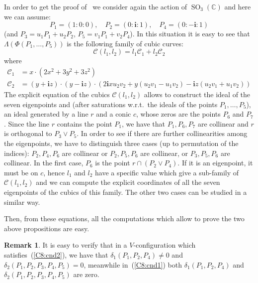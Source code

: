 \documentclass{amsart}
\theoremstyle{plain}
\theoremstyle{definition}
\newtheorem{rmk}[lemma]{Remark}
\newcommand{\C}{\mathbb{C}}
\newcommand{\SO}{\operatorname{SO}}
\newcommand{\iii}{\textbf{i}}
\begin{document}
In order to get the proof of~
we consider again the action of $\SO_3(\C)$ and here we can assume:
\[
P_1 = (1: 0: 0), \quad P_2 = (0: \iii: 1), \quad P_4 = (0: -\iii: 1)
\]
(and $P_3 = u_1P_1+u_2P_2$, $P_5 = v_1P_1+v_2P_4$). In this situation it
is easy to see that $\Lambda(\Phi(P_1, \dots, P_5))$
is the following family of cubic curves:
\[
\mathcal{C}(l_1, l_2) = l_1\mathcal{C}_1+l_2\mathcal{C}_2
\]
where
\begin{align*}
  \mathcal{C}_1 & = x \cdot \left(2x^{2} + 3 y^{2} + 3 z^{2}\right)\\
  \mathcal{C}_2 & = (y + \iii z) \cdot (y - \iii z)
\cdot \left(2 \iii x u_{2} v_{2} + y (u_{2} v_{1}- u_{1} v_{2})
- \iii z (u_{2} v_{1}  + u_{1} v_{2})\right)
\end{align*}
The explicit equation of the cubics $\mathcal{C}(l_1, l_2)$ allows to
construct the ideal of the seven eigenpoints and (after
saturations w.r.t.\ the ideals of the points $P_1, \dotsc, P_5$),
an ideal generated by a line $r$ and a conic $c$, whose zeros are
the points $P_6$ and $P_7$. Since the line $r$ contains the point $P_1$,
we have that $P_1, P_6, P_7$ are collinear and $r$ is orthogonal to
$P_3\vee P_5$. In order to see if there are further collinearities among the
eigenpoints, we have to distinguish three cases (up to permutation
of the indices): $P_2, P_4, P_6$ are collinear or $P_2, P_5, P_6$ are
collinear, or $P_3, P_5, P_6$ are collinear. In the first case, $P_6$
is the point $r \cap (P_2\vee P_4)$. If it is an eigenpoint, it must be
on $c$, hence $l_1$ and $l_2$ have a specific value which give a sub-family
of $\mathcal{C}(l_1, l_2)$ and we can compute the explicit coordinates of
all the seven eigenpoints of the cubics of this family. The other two
cases can be studied in a similar way.

Then, from these equations, all the computations which allow to prove
the two above propositions are easy.
%
\begin{rmk}
\label{rmk:delta1_and_delta2}
It is easy to verify that in
a $V$-configuration which satisfies~(\ref{C8:cnd2}), we have that
$\delta_1(P_1, P_2, P_4)\neq 0$ and
$\delta_2(P_1, P_2, P_3, P_4, P_5) = 0$,
meanwhile in~(\ref{C8:cnd1}) both $\delta_1(P_1, P_2, P_4)$ and
$\delta_2(P_1, P_2, P_3, P_4, P_5)$ are zero.
\end{rmk}
\end{document}
